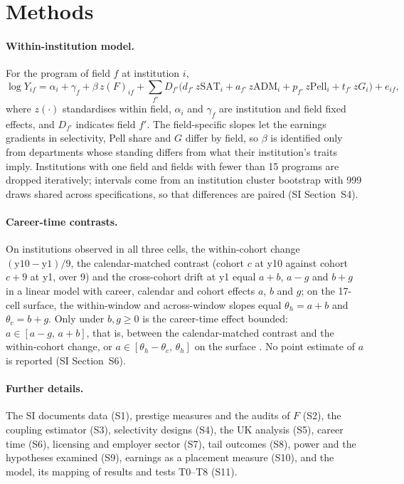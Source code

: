 \documentclass[11pt]{article}
\newcommand{\SI}[1]{SI Section~S#1}
\begin{document}
\section{Methods}\label{sec:methods}

\paragraph{Within-institution model.} For the program of field $f$ at institution $i$,
\begin{equation}
\log Y_{if}=\alpha_i+\gamma_f+\beta\,z(F)_{if}+\sum_{f'} D_{f'}\big(d_{f'}\,z\mathrm{SAT}_i+a_{f'}\,z\mathrm{ADM}_i+p_{f'}\,z\mathrm{Pell}_i+t_{f'}\,zG_i\big)+e_{if},\label{eq:fe}
\end{equation}
where $z(\cdot)$ standardises within field, $\alpha_i$ and $\gamma_f$ are institution and field fixed effects, and
$D_{f'}$ indicates field $f'$. The field-specific slopes let the earnings gradients in selectivity, Pell share and
$G$ differ by field, so $\beta$ is identified only from departments whose standing differs from what their
institution's traits imply. Institutions with one field and fields with fewer than 15 programs are dropped
iteratively; intervals come from an institution cluster bootstrap with 999 draws shared across specifications, so
that differences are paired (\SI{4}).

\paragraph{Career-time contrasts.} On institutions observed in all three cells, the within-cohort change
$(\text{y10}-\text{y1})/9$, the calendar-matched contrast (cohort $c$ at y10 against cohort $c+9$ at y1, over 9) and
the cross-cohort drift at y1 equal $a+b$, $a-g$ and $b+g$ in a linear model with career, calendar and cohort effects
$a$, $b$ and $g$; on the 17-cell surface, the within-window and across-window slopes equal $\theta_h=a+b$ and
$\theta_c=b+g$. Only under $b,g\ge0$ is the career-time effect bounded: $a\in[a-g,\,a+b]$, that is, between the
calendar-matched contrast and the within-cohort change, or $a\in[\theta_h-\theta_c,\,\theta_h]$ on the surface
\citep{fosse2019bounding}. No point estimate of $a$ is reported (\SI{6}).

\paragraph{Further details.} The SI documents data (S1), prestige measures and the audits of $F$ (S2), the
coupling estimator (S3), selectivity designs (S4), the UK analysis (S5), career time (S6), licensing and employer
sector (S7), tail outcomes (S8), power and the hypotheses examined (S9), earnings as a placement measure (S10), and
the model, its mapping of results and tests T0--T8 (S11).
\end{document}
